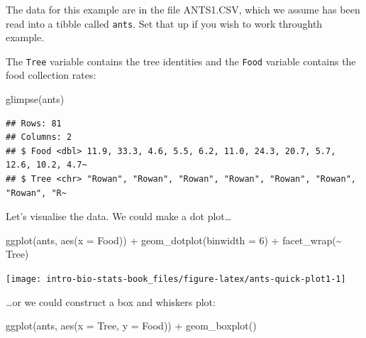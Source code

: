 \documentclass[
]{book}
\newenvironment{Shaded}{\begin{snugshade}}{\end{snugshade}}
\newcommand{\AttributeTok}[1]{\textcolor[rgb]{0.77,0.63,0.00}{#1}}
\newcommand{\DecValTok}[1]{\textcolor[rgb]{0.00,0.00,0.81}{#1}}
\newcommand{\FunctionTok}[1]{\textcolor[rgb]{0.00,0.00,0.00}{#1}}
\newcommand{\NormalTok}[1]{#1}
\newcommand{\SpecialCharTok}[1]{\textcolor[rgb]{0.00,0.00,0.00}{#1}}
\newenvironment{greybox}{
  \definecolor{shadecolor}{rgb}{0.95,0.95,0.95}  %
  \color{black}
  \begin{shaded}}
 {\end{shaded}}
\newenvironment{infobox}[1]
  {
  \begin{itemize}
  \renewcommand{\labelitemi}{
    \raisebox{-.7\height}[0pt][0pt]{
      {\setkeys{Gin}{width=3em,keepaspectratio}
        \texttt{[image: images/\#1]}}
    }
  }
  \setlength{\fboxsep}{1em}
  \begin{greybox}
  \item
  }
  {
  \end{greybox}
  \end{itemize}
  }
\begin{document}
\begin{infobox}{action}

\hypertarget{section-17}{%
\subsubsection*{}\label{section-17}}

The data for this example are in the file ANTS1.CSV, which we assume has been read into a tibble called \texttt{ants}. Set that up if you wish to work throughth example.

\end{infobox}

The \texttt{Tree} variable contains the tree identities and the \texttt{Food} variable contains the food collection rates:

\begin{Shaded}
\begin{Highlighting}[]
\FunctionTok{glimpse}\NormalTok{(ants)}
\end{Highlighting}
\end{Shaded}

\begin{verbatim}
## Rows: 81
## Columns: 2
## $ Food <dbl> 11.9, 33.3, 4.6, 5.5, 6.2, 11.0, 24.3, 20.7, 5.7, 12.6, 10.2, 4.7~
## $ Tree <chr> "Rowan", "Rowan", "Rowan", "Rowan", "Rowan", "Rowan", "Rowan", "R~
\end{verbatim}

Let's visualise the data. We could make a dot plot\ldots{}

\begin{Shaded}
\begin{Highlighting}[]
\FunctionTok{ggplot}\NormalTok{(ants, }\FunctionTok{aes}\NormalTok{(}\AttributeTok{x =}\NormalTok{ Food)) }\SpecialCharTok{+} 
  \FunctionTok{geom\_dotplot}\NormalTok{(}\AttributeTok{binwidth =} \DecValTok{6}\NormalTok{) }\SpecialCharTok{+} \FunctionTok{facet\_wrap}\NormalTok{(}\SpecialCharTok{\textasciitilde{}}\NormalTok{ Tree)}
\end{Highlighting}
\end{Shaded}

\begin{center}\texttt{[image: intro-bio-stats-book\_files/figure-latex/ants-quick-plot1-1]} \end{center}

\ldots or we could construct a box and whiskers plot:

\begin{Shaded}
\begin{Highlighting}[]
\FunctionTok{ggplot}\NormalTok{(ants, }\FunctionTok{aes}\NormalTok{(}\AttributeTok{x =}\NormalTok{ Tree, }\AttributeTok{y =}\NormalTok{ Food)) }\SpecialCharTok{+} 
  \FunctionTok{geom\_boxplot}\NormalTok{()}
\end{Highlighting}
\end{Shaded}
\end{document}
